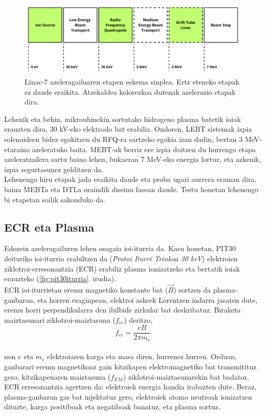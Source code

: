 \documentclass[12pt]{article}
\numberwithin{figure}{section}
\numberwithin{equation}{section}
\begin{document}
\begin{figure}[h]
    \centering
    \includegraphics[width=\linewidth]{1 - Sarrera/etapas linac7.png}
    \caption{Linac-7 azeleragailuaren etapen eskema sinplea. Ertz eteneko etapak ez daude eraikita. Atzekaldea kolorezkoa dutenak azelerazio etapak dira.}
    \label{fig:linac7etapak}
\end{figure}
Lehenik eta behin, mikrouhinekin sortutako hidrogeno plasma batetik ioiak erauzten dira, 30 kV-eko elektrodo bat erabiliz. Ondoren, LEBT sistemak izpia solenoideen bidez egokitzen du RFQ-ra sartzeko egokia izan dadin, bertan 3 MeV-etaraino azeleratuko baita. MEBT-ak berriz ere izpia doitzen du hurrengo etapa azeleratzailera sartu baino lehen, bukaeran 7 MeV-eko energia lortuz, eta azkenik, izpia segurtasunez gelditzen da.\\

Lehenengo hiru etapak jada eraikita daude eta proba ugari aurrera eraman dira, baina MEBTa eta DTLa oraindik diseinu fasean daude. Testu honetan lehenengo bi etapetan soilik sakonduko da.

\subsection{ECR eta Plasma}
\label{sec:ecrplasma}

Edozein azeleragailuren lehen osagaia ioi-iturria da. Kasu honetan, PIT30 deituriko ioi-iturria erabiltzen da (\textit{Protoi Iturri Trinkoa 30 keV})\cite{elorza_romera_pit30_2021} elektroien ziklotroi-erresonantzia (ECR) erabiliz plasma ionizatzeko eta bertatik ioiak erauzteko (\ref{fig:pit30iturria}. irudia). \\

ECR ioi-iturrietan eremu magnetiko konstante bat ($\Vec{B}$) sortzen da plasma\hyp{}ganbaran, eta horren eraginpean, elektroi askeek Lorentzen indarra jasaten dute, eremu horri perpendikularra den ibilbide zirkular bat deskribatuz. Biraketa maiztasunari ziklotroi-maiztasuna ($f_{ce}$) deritzo,\\

\begin{equation}
    f_{ce} = \frac{eB}{2\pi m_{e}}
\label{eq:ziklotroi}
\end{equation}
\\
non $e$ eta $m_e$ elektroiaren karga eta masa diren, hurrenez hurren. Orduan, ganbarari eremu magnetikoaz gain kitzikapen elektromagnetiko bat transmitituz gero, kitzikapenaren maiztasuna ($f_{EM}$) ziklotroi-maiztasunarekin bat badator, ECR erresonantzia agertzen da: elektroiek energia handia irabazten dute. Beraz, plasma-ganbaran gas bat injektatuz gero, elektroiek atomo neutroak ionizatzen dituzte, karga positiboak eta negatiboak banatuz, eta plasma sortuz.
\end{document}
